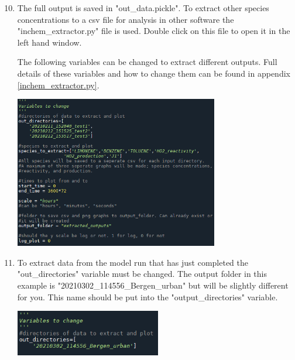 \documentclass[a4paper]{refart}
\begin{document}
\newpage
{\hspace*{-\leftmarginwidth}
\begin{minipage}{\fullwidth}
\linespread{2.0}\selectfont
\begin{enumerate}
\setcounter{enumi}{9}
    \item The full output is saved in "out\_data.pickle". To extract other species concentrations to a csv file for analysis in other software the "inchem\_extractor.py" file is used. Double click on this file to open it in the left hand window.

    The following variables can be changed to extract different outputs. Full details of these variables and how to change them can be found in appendix \ref{inchem_extractor.py}.

            \vspace{1em}
            \begin{minipage}[t]{\linewidth}
                \centering
                \includegraphics[width = 0.7\textwidth]{extractor.png}
            \end{minipage}

    \item To extract data from the model run that has just completed the "out\_directories" variable must be changed. The output folder in this example is "20210302\_114556\_Bergen\_urban" but will be slightly different for you. This name should be put into the "output\_directories" variable.

            \vspace{1em}
            \begin{minipage}[t]{\linewidth}
                \centering
                \includegraphics[width = 0.5\textwidth]{out_directories_variable.png}
            \end{minipage}


\end{enumerate}
\end{minipage}}
\end{document}
